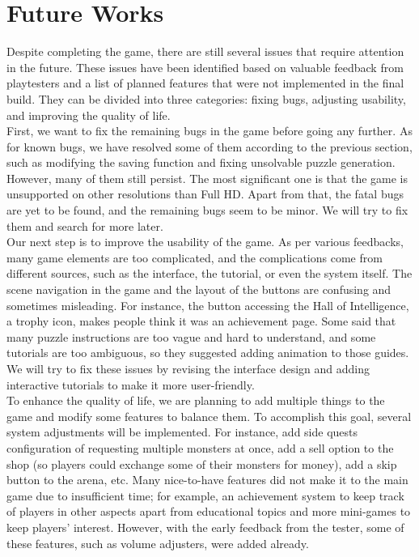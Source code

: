 \documentclass[12pt,oneside,openright,a4paper]{cpe-english-project}
\begin{document}
\section{Future Works}
	Despite completing the game, there are still several issues that require attention in the future. These issues have been identified based on valuable feedback from playtesters and a list of planned features that were not implemented in the final build. They can be divided into three categories: fixing bugs, adjusting usability, and improving the quality of life. \\
	First, we want to fix the remaining bugs in the game before going any further. As for known bugs, we have resolved some of them according to the previous section, such as modifying the saving function and fixing unsolvable puzzle generation. However, many of them still persist. The most significant one is that the game is unsupported on other resolutions than Full HD. Apart from that, the fatal bugs are yet to be found, and the remaining bugs seem to be minor. We will try to fix them and search for more later. \\
	Our next step is to improve the usability of the game. As per various feedbacks, many game elements are too complicated, and the complications come from different sources, such as the interface, the tutorial, or even the system itself. The scene navigation in the game and the layout of the buttons are confusing and sometimes misleading. For instance, the button accessing the Hall of Intelligence, a trophy icon, makes people think it was an achievement page. Some said that many puzzle instructions are too vague and hard to understand, and some tutorials are too ambiguous, so they suggested adding animation to those guides. We will try to fix these issues by revising the interface design and adding interactive tutorials to make it more user-friendly. \\
	To enhance the quality of life, we are planning to add multiple things to the game and modify some features to balance them. To accomplish this goal, several system adjustments will be implemented. For instance, add side quests configuration of requesting multiple monsters at once, add a sell option to the shop (so players could exchange some of their monsters for money), add a skip button to the arena, etc. Many nice-to-have features did not make it to the main game due to insufficient time; for example, an achievement system to keep track of players in other aspects apart from educational topics and more mini-games to keep players' interest. However, with the early feedback from the tester, some of these features, such as volume adjusters, were added already. \\
\end{document}
